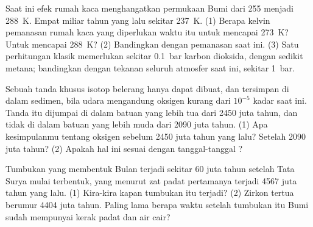 \begin{exercise}[$\star\star\star$]\label{exo:g12:early-earth:13}
Saat ini efek rumah kaca menghangatkan permukaan Bumi dari 255 menjadi
\qty{288}{K}. Empat miliar tahun yang lalu  sekitar
\qty{237}{K}. (1) Berapa kelvin pemanasan rumah kaca yang diperlukan waktu itu
untuk mencapai \qty{273}{K}? Untuk mencapai \qty{288}{K}? (2) Bandingkan
dengan pemanasan saat ini. (3) Satu perhitungan klasik memerlukan sekitar
\qty{0.1}{bar} karbon dioksida, dengan sedikit metana; bandingkan dengan
tekanan seluruh atmosfer saat ini, sekitar \qty{1}{bar}.
\end{exercise}

\begin{exercise}[$\star\star\star$]\label{exo:g12:early-earth:14}
Sebuah tanda khusus isotop belerang hanya dapat dibuat, dan tersimpan di dalam
sedimen, bila udara mengandung oksigen kurang dari $10^{-5}$ kadar saat ini.
Tanda itu dijumpai di dalam batuan yang lebih tua dari 2450 juta tahun, dan
tidak di dalam batuan yang lebih muda dari 2090 juta tahun. (1) Apa
kesimpulanmu tentang oksigen sebelum 2450 juta tahun yang lalu? Setelah 2090
juta tahun? (2) Apakah hal ini sesuai dengan tanggal-tanggal ?
\end{exercise}

\begin{exercise}[$\star\star\star$]\label{exo:g12:early-earth:15}
Tumbukan yang membentuk Bulan terjadi sekitar 60 juta tahun setelah Tata Surya
mulai terbentuk, yang menurut zat padat pertamanya terjadi 4567 juta tahun yang
lalu. (1) Kira-kira kapan tumbukan itu terjadi? (2) Zirkon tertua berumur
\num{4404} juta tahun. Paling lama berapa waktu setelah tumbukan itu Bumi sudah
mempunyai kerak padat dan air cair?
\end{exercise}

